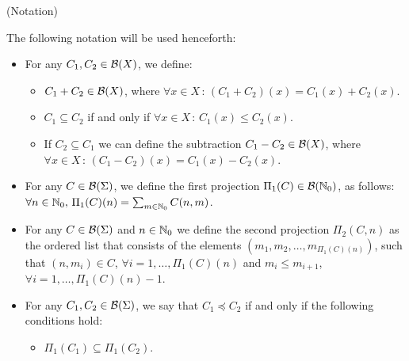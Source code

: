 \begin{definition} (Notation)

The following notation will be used henceforth:

\vspace*{-0.2cm}

\begin{itemize}
%
%
%
\item For any $C_1, C_2 \in {\cal B}(X)$, we define:
  \begin{itemize}
  \item $C_1 + C_2 \in {\cal B}(X)$, where $\forall x \in X\,:\,
        (C_1+C_2)(x)= C_1(x) + C_2(x)$.
  \item $C_1 \subseteq C_2$ if and only if $\forall x \in X\,:\,
        C_1(x) \leq C_2(x)$.
  \item If $C_2 \subseteq C_1$ we can define the subtraction 
        $C_1 - C_2 \in {\cal B}(X)$, where $\forall x \in X\,:\,
        (C_1-C_2)(x)= C_1(x) - C_2(x)$.
  \end{itemize}
%
\item For any $C \in {\cal B}(\Sigma)$, 
we define the first projection
$\Pi_1(C) \in {\cal B}(\mathbb{N}_{0})$, 
as follows: $\forall n \in \mathbb{N}_{0},\,
\Pi_1(C)(n) = \sum_{m\in \mathbb{N}_{0}} C(n,m)$.
%
\item For any $C \in {\cal B}(\Sigma)$
and $n\in \mathbb{N}_{0}$ we define the second projection 
$\Pi_2(C,n)$ as the ordered list that consists of the
elements $(m_1,m_2,\ldots,m_{\Pi_1(C)(n)})$,
such that $(n,m_i) \in C$, $\forall i=1,\ldots, \Pi_1(C)(n)$
and $m_i \leq m_{i+1}$,
$\forall i=1,\ldots, \Pi_1(C)(n)-1$.
%
\item For any $C_1,C_2 \in {\cal B}(\Sigma)$, we say that
$C_1 \preceq C_2$ if and only if the following conditions hold:
  \begin{itemize}
  \item $\Pi_1(C_1) \subseteq \Pi_1(C_2)$.

\end{itemize}
\end{itemize}
\end{definition}
